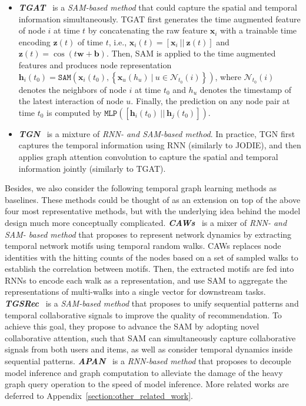 \begin{itemize} [noitemsep,topsep=0pt,leftmargin=5mm ]
\item \noindent\textit{\textbf{TGAT}}~\cite{xu2020inductive} is a \emph{SAM-based method} that could capture the spatial and temporal information simultaneously.
TGAT first generates the time augmented feature of node $i$ at time $t$ by concatenating the raw feature $\mathbf{x}_i$ with a trainable time encoding $\mathbf{z}(t)$ of time $t$, i.e.,
$ \mathbf{x}_i(t) = [\mathbf{x}_i~||~ \mathbf{z}(t)]$ and $\mathbf{z}(t) = \cos( t \mathbf{w} + \mathbf{b})$.
Then, SAM is applied to the time augmented features and produces node representation 
$\mathbf{h}_i(t_0)= \texttt{SAM}\left(\mathbf{x}_i(t_0), \left\{\mathbf{x}_u(h_u)~|~u\in\mathcal{N}_{t_0}(i) \right\}\right)$, where $\mathcal{N}_{t_0}(i)$ denotes the neighbors of node $i$ at time $t_0$ and $h_u$ denotes the timestamp of the latest interaction of node $u$.
Finally, the prediction on any node pair at time $t_0$ is computed by $\texttt{MLP}([\mathbf{h}_i(t_0)~||~ \mathbf{h}_j(t_0)]) $.

\item \noindent\textit{\textbf{TGN}}~\cite{tgn_icml_grl2020} is a mixture of \emph{RNN- and SAM-based method}. 
In practice, TGN first captures the temporal information using RNN (similarly to JODIE), and then applies graph attention convolution to capture the spatial and temporal information jointly (similarly to TGAT).
\end{itemize}

Besides, we also consider the following temporal graph learning methods as baselines. These methods could be thought of as an extension on top of the above four most representative methods, but with the underlying idea behind the model design much more conceptually complicated.
\textit{\textbf{CAWs}}~\cite{wang2020inductive} is a mixer of \emph{RNN- and SAM- based method} that proposes to represent network dynamics by extracting temporal network motifs using temporal random walks.
CAWs  replaces node identities with the hitting counts of the nodes based on a set of sampled walks to establish the correlation between motifs. Then, the extracted motifs are fed into RNNs to encode each walk as a representation, and use SAM to aggregate the representations of multi-walks into a single vector for downstream tasks.
\textit{\textbf{TGSRec}}~\cite{fan2021continuous} is a \emph{SAM-based method} that proposes to unify sequential patterns and temporal collaborative signals to improve the quality of recommendation. To achieve this goal, they propose to advance the SAM by adopting novel collaborative attention, such that SAM can simultaneously capture collaborative signals from both users and items, as well as consider temporal dynamics inside sequential patterns.
\textit{\textbf{APAN}}~\cite{wang2021apan} is a \emph{RNN-based method} that proposes to decouple model inference and graph computation to alleviate the damage of the heavy graph query operation to the speed of model inference.
More related works are deferred to Appendix~\ref{section:other_related_work}.


